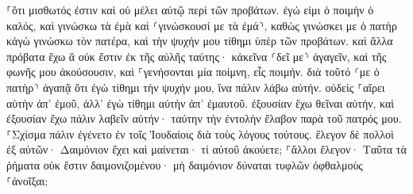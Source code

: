 \documentclass{openreader}
\begin{document}
⸀ὅτι μισθωτός ἐστιν καὶ οὐ μέλει αὐτῷ περὶ τῶν προβάτων. 
ἐγώ εἰμι ὁ ποιμὴν ὁ καλός, καὶ γινώσκω τὰ ἐμὰ καὶ ⸂γινώσκουσί με τὰ ἐμά⸃, 
καθὼς γινώσκει με ὁ πατὴρ κἀγὼ γινώσκω τὸν πατέρα, καὶ τὴν ψυχήν μου τίθημι ὑπὲρ τῶν προβάτων. 
καὶ ἄλλα πρόβατα ἔχω ἃ οὐκ ἔστιν ἐκ τῆς αὐλῆς ταύτης· κἀκεῖνα ⸂δεῖ με⸃ ἀγαγεῖν, καὶ τῆς φωνῆς μου ἀκούσουσιν, καὶ ⸀γενήσονται μία ποίμνη, εἷς ποιμήν. 
διὰ τοῦτό ⸂με ὁ πατὴρ⸃ ἀγαπᾷ ὅτι ἐγὼ τίθημι τὴν ψυχήν μου, ἵνα πάλιν λάβω αὐτήν. 
οὐδεὶς ⸀αἴρει αὐτὴν ἀπ’ ἐμοῦ, ἀλλ’ ἐγὼ τίθημι αὐτὴν ἀπ’ ἐμαυτοῦ. ἐξουσίαν ἔχω θεῖναι αὐτήν, καὶ ἐξουσίαν ἔχω πάλιν λαβεῖν αὐτήν· ταύτην τὴν ἐντολὴν ἔλαβον παρὰ τοῦ πατρός μου. 
⸀Σχίσμα πάλιν ἐγένετο ἐν τοῖς Ἰουδαίοις διὰ τοὺς λόγους τούτους. 
ἔλεγον δὲ πολλοὶ ἐξ αὐτῶν· Δαιμόνιον ἔχει καὶ μαίνεται· τί αὐτοῦ ἀκούετε; 
⸀ἄλλοι ἔλεγον· Ταῦτα τὰ ῥήματα οὐκ ἔστιν δαιμονιζομένου· μὴ δαιμόνιον δύναται τυφλῶν ὀφθαλμοὺς ⸀ἀνοῖξαι; 
\end{document}
